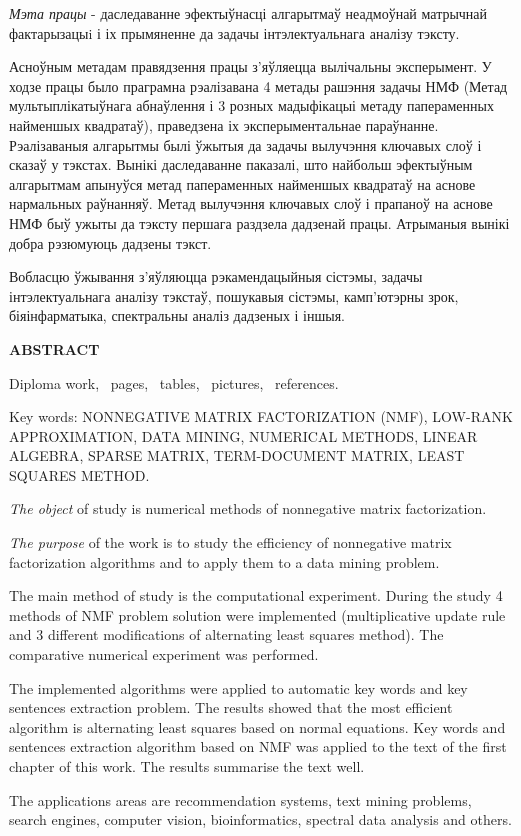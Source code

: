 
\textit{Мэта працы} - даследаванне эфектыўнасці алгарытмаў неадмоўнай матрычнай фактарызацыi і іх прымяненне да задачы інтэлектуальнага аналізу тэксту.

Асноўным метадам правядзення працы з'яўляецца вылічальны эксперымент. У ходзе працы было праграмна рэалізавана 4 метады рашэння задачы НМФ
(Метад мультыплікатыўнага абнаўлення і 3 розных мадыфікацыі метаду папераменных найменшых квадратаў), праведзена іх эксперыментальнае параўнанне.
Рэалізаваныя алгарытмы былі ўжытыя да задачы вылучэння ключавых слоў і сказаў у тэкстах.
Вынікі даследаванне паказалі, што найбольш эфектыўным алгарытмам апынуўся метад папераменных найменшых квадратаў на аснове нармальных раўнанняў.
Метад вылучэння ключавых слоў і прапаноў на аснове НМФ быў ужыты да тэксту першага раздзела дадзенай працы.
Атрыманыя вынікі добра рэзюмуюць дадзены тэкст.

Вобласцю ўжывання з'яўляюцца рэкамендацыйныя сістэмы, задачы інтэлектуальнага аналізу тэкстаў, пошукавыя сістэмы, камп'ютэрны зрок,
біяінфарматыка, спектральны аналіз дадзеных і іншыя.




\newpage




\begin{center}
  \fontsize{16pt}{0em}\textbf{ABSTRACT}
\end{center}

Diploma work, \npages\ pages, \ntables\ tables, \nris\ pictures, \ncite\ references.

Key words:
NONNEGATIVE MATRIX FACTORIZATION (NMF),
LOW-RANK APPROXIMATION,
DATA MINING,
NUMERICAL METHODS,
LINEAR ALGEBRA,
SPARSE MATRIX,
TERM-DOCUMENT MATRIX,
LEAST SQUARES METHOD.

\textit{The object} of study is numerical methods of nonnegative matrix factorization.


\textit{The purpose} of the work is to study the efficiency of nonnegative
matrix factorization algorithms and to apply them to a data mining problem.

The main method of study is the computational experiment.
During the study 4 methods of NMF problem solution were implemented
(multiplicative update rule and 3 different modifications of alternating least squares method).
The comparative numerical experiment was performed.

The implemented algorithms were applied to automatic key words and key sentences extraction problem.
The results showed that the most efficient algorithm is alternating least squares based on normal equations.
Key words and sentences extraction algorithm based on NMF was applied to the text of the first chapter of this work.
The results summarise the text well.

The applications areas are recommendation systems, text mining problems, search engines, computer vision,
bioinformatics, spectral data analysis and others.

\newpage
